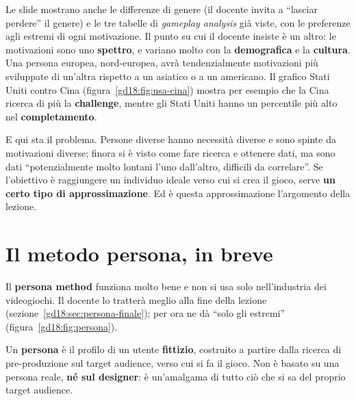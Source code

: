 Le slide mostrano anche le differenze di genere (il docente invita a ``lasciar
perdere'' il genere) e le tre tabelle di \emph{gameplay analysis} già viste, con le
preferenze agli estremi di ogni motivazione. Il punto su cui il docente insiste è
un altro: le motivazioni sono uno \textbf{spettro}, e variano molto con la
\textbf{demografica} e la \textbf{cultura}. Una persona europea, nord-europea, avrà
tendenzialmente motivazioni più sviluppate di un'altra rispetto a un asiatico o a un
americano. Il grafico Stati Uniti contro Cina (figura~\ref{gd18:fig:usa-cina})
mostra per esempio che la Cina ricerca di più la \textbf{challenge}, mentre gli Stati
Uniti hanno un percentile più alto nel \textbf{completamento}.


E qui sta il problema. Persone diverse hanno necessità diverse e sono spinte da
motivazioni diverse; finora si è visto come fare ricerca e ottenere dati, ma sono
dati ``potenzialmente molto lontani l'uno dall'altro, difficili da correlare''. Se
l'obiettivo è raggiungere un individuo ideale verso cui si crea il gioco, serve
\textbf{un certo tipo di approssimazione}. Ed è questa approssimazione l'argomento
della lezione.

\section{Il metodo persona, in breve}
\label{gd18:sec:persona}


Il \textbf{persona method} funziona molto bene e non si usa solo nell'industria dei
videogiochi. Il docente lo tratterà meglio alla fine della lezione
(sezione~\ref{gd18:sec:persona-finale}); per ora ne dà ``solo gli estremi''
(figura~\ref{gd18:fig:persona}).

\begin{definition}[Persona]
Un \textbf{persona} è il profilo di un utente \textbf{fittizio}, costruito a partire
dalla ricerca di pre-produzione sul target audience, verso cui si fa il gioco. Non è
basato su una persona reale, \textbf{né sul designer}: è un'amalgama di tutto ciò
che si sa del proprio target audience.
\end{definition}

